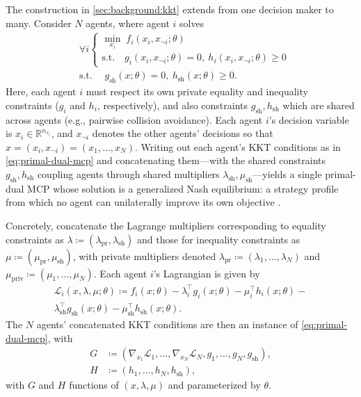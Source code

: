 \documentclass[conference]{IEEEtran}
\begin{document}
The construction in \cref{sec:background:kkt} extends from one decision maker to many.
Consider $N$ agents, where agent $i$ solves
\begin{subequations}
\begin{align}
  &\forall i \begin{cases}
  	\min_{x_i} \; f_i(x_i, x_{\neg i};\theta) \\
  	\text{s.t.} \quad g_i(x_i, x_{\neg i}; \theta) = 0,~ h_i(x_i,x_{\neg i};\theta) \ge 0
  \end{cases}\\
  &\text{s.t.} \quad \; g_\mathrm{sh}(x;\theta) = 0,~ h_\mathrm{sh}(x; \theta) \ge 0.
\end{align}
\end{subequations}
Here, each agent $i$ must respect its own private equality and inequality
constraints ($g_i$ and $h_i$, respectively), and also constraints
$g_\mathrm{sh}, h_\mathrm{sh}$ which are shared across agents
(e.g., pairwise collision avoidance).
Each agent $i$'s decision variable is $x_i \in \mathbb{R}^{n_{x_i}}$, and $x_{\neg i}$ denotes the other agents'
decisions so that $x= (x_i, x_{\neg i}) = (x_1,\dots,x_N)$. Writing out each agent's KKT conditions as in
\cref{eq:primal-dual-mcp} and concatenating them---with the shared constraints $g_\mathrm{sh}, h_\mathrm{sh}$
coupling agents through shared multipliers $\lambda_\mathrm{sh}, \mu_\mathrm{sh}$---yields a single primal-dual MCP whose
solution is a generalized Nash equilibrium: a strategy profile from which no agent can
unilaterally improve its own objective \cite{facchinei2003finite}.

Concretely, concatenate the Lagrange multipliers corresponding to equality
constraints as $\lambda \coloneqq
(\lambda_\mathrm{pr}, \lambda_\mathrm{sh})$ and those for inequality
constraints as $\mu \coloneqq (\mu_\mathrm{pr}, \mu_\mathrm{sh})$, with
private multipliers denoted $\lambda_\mathrm{pr} \coloneqq (\lambda_1,\dots,\lambda_N)$ and
$\mu_\mathrm{priv} \coloneqq (\mu_1,\dots,\mu_N)$. Each agent $i$'s Lagrangian is given by %
\begin{multline}
  \label{eq:lagrangian}
  \mathcal{L}_i(x, \lambda, \mu; \theta) \coloneqq f_i(x; \theta) -
  \lambda_i^\top g_i(x; \theta) - \mu_i^\top h_i(x; \theta) - \\
  \lambda_\mathrm{sh}^\top g_\mathrm{sh}(x; \theta) - \mu_\mathrm{sh}^\top h_\mathrm{sh}(x; \theta).
\end{multline}
The $N$ agents' concatenated KKT conditions are then an
instance of \cref{eq:primal-dual-mcp}, with
\begin{equation}
  \begin{aligned}
    G &\coloneqq \left(\nabla_{x_1} \mathcal{L}_1, \dots, \nabla_{x_N} \mathcal{L}_N, g_1,\dots,g_N,
    g_\mathrm{sh}\right), \\
    H &\coloneqq \left(h_1,\dots,h_N,h_\mathrm{sh}\right),
  \end{aligned}
  \label{eq:game-mcp}
\end{equation}
with $G$ and $H$ functions of $(x, \lambda, \mu)$ and parameterized by $\theta$.
\end{document}

